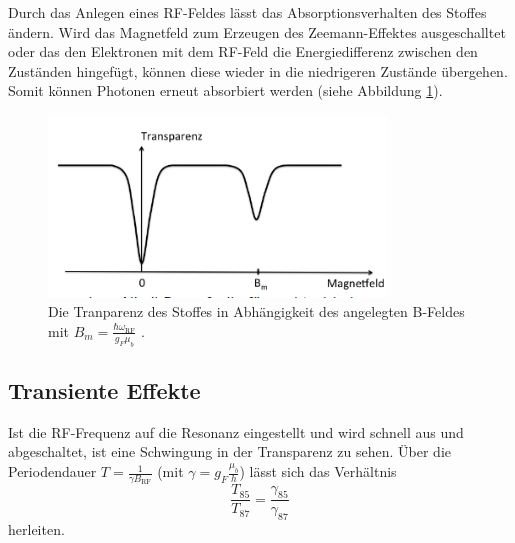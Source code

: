 \noindent Durch das Anlegen eines RF-Feldes lässt das Absorptionsverhalten des Stoffes ändern.
Wird das Magnetfeld zum Erzeugen des Zeemann-Effektes ausgeschalltet oder das den
Elektronen mit dem RF-Feld die Energiedifferenz zwischen den Zuständen hingefügt,
können diese wieder in die niedrigeren Zustände übergehen.
Somit können Photonen erneut absorbiert werden (siehe Abbildung \ref{fig:trans}).

\begin{figure}
    \centering
    \includegraphics[width=0.80\textwidth]{Fotos/trans.png}
    \caption{Die Tranparenz des Stoffes in Abhängigkeit des angelegten B-Feldes 
    mit $B_m = \frac{\hbar \omega_\text{RF}}{g_F \mu_b }$ \cite{V21}.}
    \label{fig:trans}
\end{figure}

\subsection{Transiente Effekte}
\noindent Ist die RF-Frequenz auf die Resonanz eingestellt 
und wird schnell aus und abgeschaltet,
ist eine Schwingung in der Transparenz zu sehen. 
Über die Periodendauer $T=\frac{1}{\gamma B_\text{RF}}$ 
(mit $\gamma = g_F \frac{\mu_b}{h}$) lässt sich das Verhältnis
\begin{equation}
    \frac{T_85}{T_87} = \frac{\gamma_85}{\gamma_87}
\end{equation}
\noindent herleiten.



